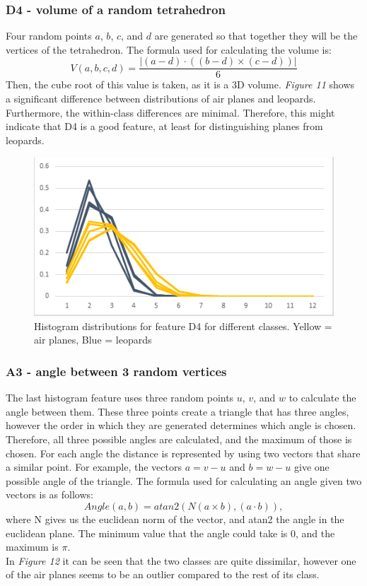 \documentclass{bigdata}
\begin{document}
\subsubsection{D4 - volume of a random tetrahedron}
Four random points $a$, $b$, $c$, and $d$ are generated so that together they will be the vertices of the tetrahedron. The formula used for calculating the volume is:
\begin{equation}
V(a,b,c,d) = \frac{|(a - d) \cdot ((b - d) \times (c - d))|}{6}
\end{equation}
Then, the cube root of this value is taken, as it is a 3D volume. \textit{ Figure 11} shows a significant difference between distributions of air planes and leopards. Furthermore, the within-class differences are minimal. Therefore, this might indicate that D4 is a good feature, at least for distinguishing planes from leopards. 
\begin{figure}[h!]
\begin{center}
    \includegraphics[width=0.7\linewidth]{Pictures/Part3/D4.png}
    \caption{Histogram distributions for feature D4 for different classes. Yellow = air planes, Blue = leopards}
  \label{fig:eccentricity}
\end{center}
\end{figure}

\subsubsection{A3 - angle between 3 random vertices}
The last histogram feature uses three random points $u$, $v$, and $w$ to calculate the angle between them. These three points create a triangle that has three angles, however the order in which they are generated determines which angle is chosen. Therefore, all three possible angles are calculated, and the maximum of those is chosen. For each angle the distance is represented by using two vectors that share a similar point. For example, the vectors $a = v - u$ and $b = w - u$ give one possible angle of the triangle. The formula used for calculating an angle given two vectors is as follows:
\begin{equation}
Angle(a,b) = atan2(N(a \times b), (a \cdot b)),
\end{equation}
where N gives us the euclidean norm of the vector, and atan2 the angle in the euclidean plane. The minimum value that the angle could take is 0, and the maximum is $\pi$. \\
In \textit{Figure 12} it can be seen that the two classes are quite dissimilar, however one of the air planes seems to be an outlier compared to the rest of its class.
\end{document}
